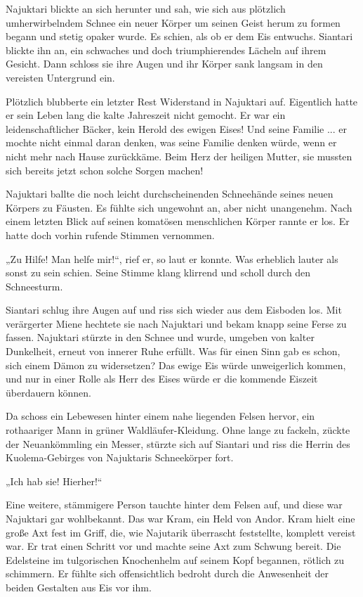 \documentclass[10pt, a4paper, oneside]{book}
\begin{document}
Najuktari blickte an sich herunter und sah, wie sich aus plötzlich umherwirbelndem Schnee ein neuer Körper um seinen Geist herum zu formen begann und stetig opaker wurde. Es schien, als ob er dem Eis entwuchs. Siantari blickte ihn an, ein schwaches und doch triumphierendes Lächeln auf ihrem Gesicht. Dann schloss sie ihre Augen und ihr Körper sank langsam in den vereisten Untergrund ein.

Plötzlich blubberte ein letzter Rest Widerstand in Najuktari auf. Eigentlich hatte er sein Leben lang die kalte Jahreszeit nicht gemocht. Er war ein leidenschaftlicher Bäcker, kein Herold des ewigen Eises! Und seine Familie ... er mochte nicht einmal daran denken, was seine Familie denken würde, wenn er nicht mehr nach Hause zurückkäme. Beim Herz der heiligen Mutter, sie mussten sich bereits jetzt schon solche Sorgen machen!

Najuktari ballte die noch leicht durchscheinenden Schneehände seines neuen Körpers zu Fäusten. Es fühlte sich ungewohnt an, aber nicht unangenehm. Nach einem letzten Blick auf seinen komatösen menschlichen Körper rannte er los. Er hatte doch vorhin rufende Stimmen vernommen.

„Zu Hilfe! Man helfe mir!“, rief er, so laut er konnte. Was erheblich lauter als sonst zu sein schien. Seine Stimme klang klirrend und scholl durch den Schneesturm.

Siantari schlug ihre Augen auf und riss sich wieder aus dem Eisboden los. Mit verärgerter Miene hechtete sie nach Najuktari und bekam knapp seine Ferse zu fassen. Najuktari stürzte in den Schnee und wurde, umgeben von kalter Dunkelheit, erneut von innerer Ruhe erfüllt. Was für einen Sinn gab es schon, sich einem Dämon zu widersetzen? Das ewige Eis würde unweigerlich kommen, und nur in einer Rolle als Herr des Eises würde er die kommende Eiszeit überdauern können.

Da schoss ein Lebewesen hinter einem nahe liegenden Felsen hervor, ein rothaariger Mann in grüner Waldläufer-Kleidung. Ohne lange zu fackeln, zückte der Neuankömmling ein Messer, stürzte sich auf Siantari und riss die Herrin des Kuolema-Gebirges von Najuktaris Schneekörper fort.

„Ich hab sie! Hierher!“

Eine weitere, stämmigere Person tauchte hinter dem Felsen auf, und diese war Najuktari gar wohlbekannt. Das war Kram, ein Held von Andor. Kram hielt eine große Axt fest im Griff, die, wie Najutarik überrascht feststellte, komplett vereist war. Er trat einen Schritt vor und machte seine Axt zum Schwung bereit. Die Edelsteine im tulgorischen Knochenhelm auf seinem Kopf begannen, rötlich zu schimmern. Er fühlte sich offensichtlich bedroht durch die Anwesenheit der beiden Gestalten aus Eis vor ihm.
\end{document}
